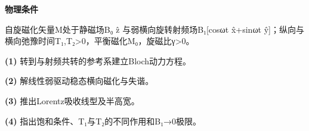 \textbf{物理条件}\par 自旋磁化矢量M处于静磁场B₀ ẑ 与弱横向旋转射频场B₁[cosωt x̂+sinωt ŷ]；纵向与横向弛豫时间T₁,T₂>0，平衡磁化M₀，旋磁比γ>0。
\par\noindent\textbf{(1)} 转到与射频共转的参考系建立Bloch动力方程。
\par\noindent\textbf{(2)} 解线性弱驱动稳态横向磁化与失谐。
\par\noindent\textbf{(3)} 推出Lorentz吸收线型及半高宽。
\par\noindent\textbf{(4)} 指出饱和条件、T₁与T₂的不同作用和B₁→0极限。
